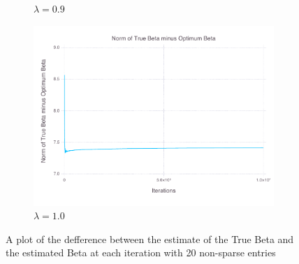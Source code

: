 \documentclass[12pt, leqno]{article}
\begin{document}
\begin{figure}
\begin{subfigure}[b]{0.4\textwidth}
                \caption{$\lambda = 0.9$}
                \label{}
        \end{subfigure}
        \begin{subfigure}[b]{0.4\textwidth}
                \includegraphics[width=\textwidth]{trueerrorplot10-20.pdf}
                \caption{$\lambda = 1.0$}
                \label{}
        \end{subfigure}%
        \caption{A plot of the defference between the estimate of the
          True Beta and the estimated Beta at each iteration with 20 non-sparse entries}\label{fig:trueerrors20-2}
\end{figure}
\end{document}
